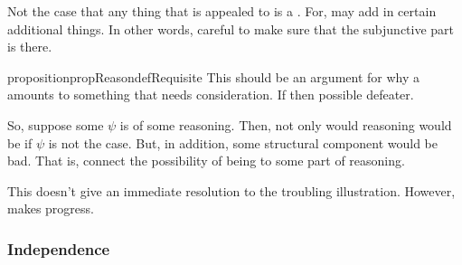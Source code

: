 \begin{note}
  Not the case that any thing that is appealed to is a \requ{}.
  For, may add in certain additional things.
  In other words, careful to make sure that the subjunctive part is there.
\end{note}


\begin{note}
  \begin{restatable}[]{proposition}{propReasondefRequisite}\label{prop:reason-requ}
    {
      \color{red} This should be an argument for why a \requ{} amounts to something that needs consideration.
    }
    If \requ{} then possible defeater.
  \end{restatable}

  So, suppose some \(\psi\) is \requ{} of some reasoning.
  Then, not only would reasoning would be \mom{} if \(\psi\) is not the case.
  But, in addition, some structural component would be bad.
  That is, connect the possibility of being \mom{} to some part of reasoning.
\end{note}

\begin{note}
  This doesn't give an immediate resolution to the troubling illustration.
  However, makes progress.
\end{note}

\subsubsection{Independence}
\label{sec:two-assumpt-regard}

